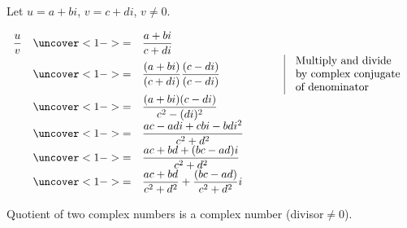 \begin{frame}
Let $u=a+bi$, $v=c+di$, $v\neq 0$.
\begin{example}
$\begin{array}{rcll|l}
\displaystyle\frac{u}{v}&\uncover<1->{=}& \displaystyle\frac{a+bi}{c+di}~~~~~~~~~~~~~~~~~~~~~~~~~~\\
&\uncover<1->{=}&\displaystyle \frac{(a+bi)}{(c+di)}\frac{(c-di)}{(c-di)} & & \begin{array}{l}
\text{Multiply and divide } \\
\text{by complex conjugate }\\
\text{of denominator}
\end{array}
\\
&\uncover<1->{=}&\displaystyle \frac{(a+bi)(c-di)}{c^2-(di)^2}\\
&\uncover<1->{=}&\displaystyle \frac{ac-adi+cbi-bdi^2}{c^2+d^2}\\
&\uncover<1->{=}&\displaystyle \frac{ac+bd+(bc-ad)i}{c^2+d^2}\\
&\uncover<1->{=}&\displaystyle \frac{ac+bd}{c^2+d^2}+\frac{(bc-ad)}{c^2+d^2}i\\
\end{array}
$
\end{example}
\begin{theorem}
Quotient of two complex numbers is a complex number (divisor$\neq 0$).
\end{theorem}

\vskip 10cm
\end{frame}